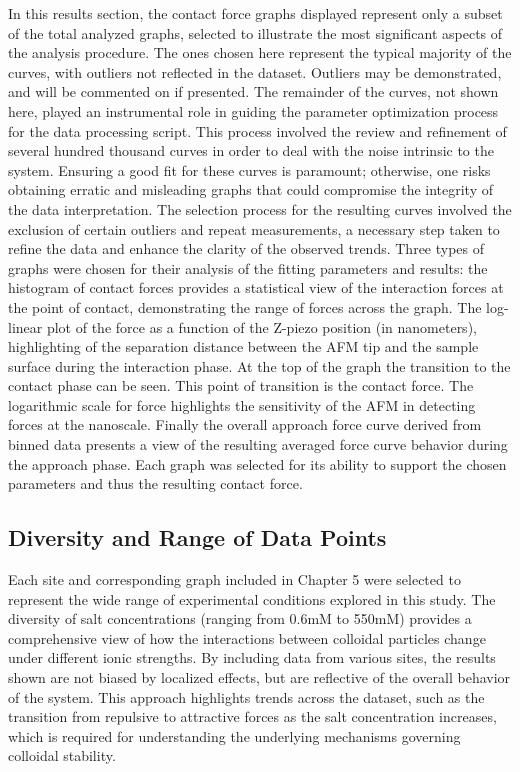 In this results section, the contact force graphs displayed represent only a subset of the total analyzed graphs, selected to illustrate the most significant aspects of the analysis procedure. The ones chosen here represent the typical majority of the curves, with outliers not reflected in the dataset. Outliers may be demonstrated, and will be commented on if presented. The remainder of the curves, not shown here, played an instrumental role in guiding the parameter optimization process for the data processing script. This process involved the review and refinement of several hundred thousand curves in order to deal with the noise intrinsic to the system. Ensuring a good fit for these curves is paramount; otherwise, one risks obtaining erratic and misleading graphs that could compromise the integrity of the data interpretation. The selection process for the resulting curves involved the exclusion of certain outliers and repeat measurements, a necessary step taken to refine the data and enhance the clarity of the observed trends. Three types of graphs were chosen for their analysis of the fitting parameters and results: the histogram of contact forces provides a statistical view of the interaction forces at the point of contact, demonstrating the range of forces across the graph. The log-linear plot of the force as a function of the Z-piezo position (in nanometers), highlighting of the separation distance between the AFM tip and the sample surface during the interaction phase. At the top of the graph the transition to the contact phase can be seen. This point of transition is the contact force. The logarithmic scale for force highlights the sensitivity of the AFM in detecting forces at the nanoscale. Finally the overall approach force curve derived from binned data presents a view of the resulting averaged force curve behavior during the approach phase. Each graph was selected for its ability to support the chosen parameters and thus the resulting contact force.

\subsection{Diversity and Range of Data Points}
Each site and corresponding graph included in Chapter 5 were selected to represent the wide range of experimental conditions explored in this study. The diversity of salt concentrations (ranging from 0.6mM to 550mM) provides a comprehensive view of how the interactions between colloidal particles change under different ionic strengths. By including data from various sites, the results shown are not biased by localized effects, but are reflective of the overall behavior of the system. This approach highlights trends across the dataset, such as the transition from repulsive to attractive forces as the salt concentration increases, which is required for understanding the underlying mechanisms governing colloidal stability.

